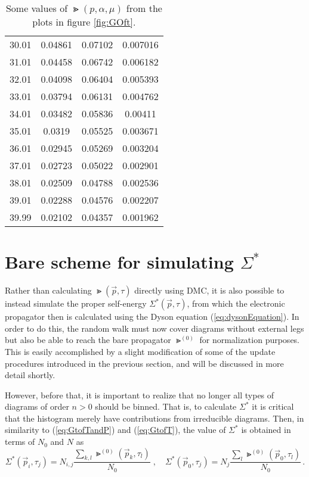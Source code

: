 \begin{table}[H]
\begin{center}
\begin{tabular}{r | c | c | c}
30.01 & 0.04861 & 0.07102 & 0.007016 \\
31.01 & 0.04458 & 0.06742 & 0.006182 \\
32.01 & 0.04098 & 0.06404 & 0.005393 \\
33.01 & 0.03794 & 0.06131 & 0.004762 \\
34.01 & 0.03482 & 0.05836 & 0.00411 \\
35.01 & 0.0319 & 0.05525 & 0.003671 \\
36.01 & 0.02945 & 0.05269 & 0.003204 \\
37.01 & 0.02723 & 0.05022 & 0.002901 \\
38.01 & 0.02509 & 0.04788 & 0.002536 \\
39.01 & 0.02288 & 0.04576 & 0.002207 \\
39.99 & 0.02102 & 0.04357 & 0.001962 \\
		\end{tabular}
	\end{center}
	\caption{Some values of $ \Gt(p, \alpha, \mu) $ from the plots in figure \ref{fig:GOft}.}
	\label{tab:truthTablesG}   
\end{table}

\section{Bare scheme for simulating $ \Sigma^* $}

Rather than calculating $ \Gt(\vec p, \tau) $ directly using DMC, it is also possible to instead simulate the proper self-energy $ \Sigma^*(\vec p, \tau) $, from which the electronic propagator then is calculated using the Dyson equation (\ref{eq:dysonEquation}).
In order to do this, the random walk must now cover diagrams without external legs but also be able to reach the bare propagator $ \Gt^{(0)} $ for normalization purposes. This is easily accomplished by a slight modification of some of the update procedures introduced in the previous section, and will be discussed in more detail shortly.

However, before that, it is important to realize that no longer all types of diagrams of order $ n > 0 $ should be binned. That is, to calculate $ \Sigma^* $ it is critical that the histogram merely have contributions from irreducible diagrams. Then, in similarity to (\ref{eq:GtofTandP}) and (\ref{eq:GtofT}), the value of $ \Sigma^* $ is obtained in terms of $ N_0 $ and $ N $ as
\begin{equation}
	\label{eq:properSnormalization}
	\Sigma^* (\vec p_i, \tau_j) = N_{i,j} \frac{\sum_{k,l} \Gt^{(0)} (\vec p_k, \tau_l)}{N_0}
	\; , \quad
	\Sigma^* (\vec p_0, \tau_j) = N_{j} \frac{\sum_{l} \Gt^{(0)} (\vec p_0, \tau_l)}{N_0} \,.
\end{equation}

